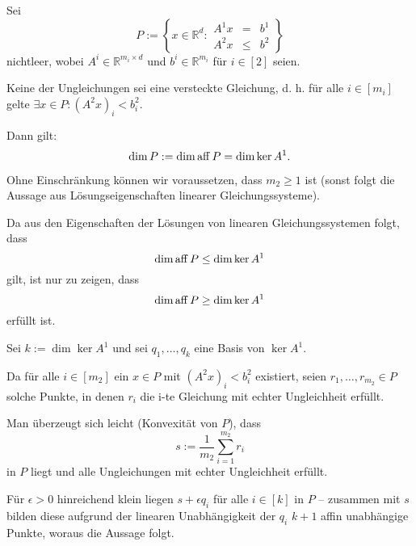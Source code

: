 \documentclass[10p,a4paper,BCOR = 12mm, DIV=15]{scrbook}
\begin{document}
\begin{Sa}
\label{sa:dim1}
Sei
\begin{displaymath}
P := \left\{x \in \mathbb{R}^d: 
\begin{array}{ccc}
A^1 x & = & b^1 \\
A^2 x & \leq & b^2
\end{array}\right\}
\end{displaymath}
nichtleer, wobei $A^i \in \mathbb{R}^{m_i \times d}$ und $b^i \in \mathbb{R}^{m_i}$ für $i \in \left[2\right]$ seien.

Keine der Ungleichungen sei eine versteckte Gleichung, d. h. für alle $i \in \left[m_i\right]$ gelte $\exists x \in P: \left(A^2 x\right)_i < b^2_i$.

Dann gilt:
\begin{displaymath}
\dim P := \dim \operatorname{aff} P = \dim \ker A^1.
\end{displaymath}
\end{Sa}
\begin{bew}
Ohne Einschränkung können wir voraussetzen, dass $m_2 \geq 1$ ist (sonst folgt die Aussage aus Lösungseigenschaften linearer Gleichungssysteme).

Da aus den Eigenschaften der Lösungen von linearen Gleichungssystemen folgt, dass
\begin{displaymath}
\dim \operatorname{aff} P \leq \dim \ker A^1
\end{displaymath}
gilt, ist nur zu zeigen, dass
\begin{displaymath}
\dim \operatorname{aff} P \geq \dim \ker A^1
\end{displaymath}
erfüllt ist.

Sei $k:= \dim \ker A^1$ und sei $q_1, \ldots, q_k$ eine Basis von $\ker A^1$.

Da für alle $i \in \left[m_2\right]$ ein $x \in P$ mit $\left(A^2 x\right)_i < b^2_i$ existiert, seien $r_1, \ldots, r_{m_2} \in P$ solche Punkte, in denen $r_i$ die i-te Gleichung mit echter Ungleichheit erfüllt.

Man überzeugt sich leicht (Konvexität von $P$), dass
\begin{displaymath}
s := \frac{1}{m_2} \sum_{i=1}^{m_2} r_i
\end{displaymath}
in $P$ liegt und alle Ungleichungen mit echter Ungleichheit erfüllt.

Für $\epsilon > 0$ hinreichend klein liegen $s+\epsilon q_i$ für alle $i \in \left[k\right]$ in $P$ -- zusammen mit $s$ bilden diese aufgrund der linearen Unabhängigkeit der $q_i$ $k+1$ affin unabhängige Punkte, woraus die Aussage folgt.
\end{bew}
\end{document}
